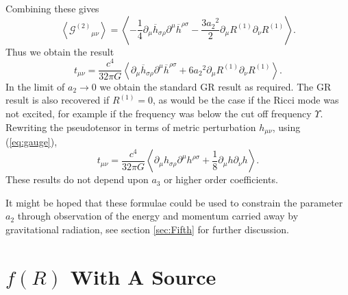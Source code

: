 \documentclass[aps,prd,reprint,showpacs]{revtex4-1}
\newcommand{\eqnref}[1]{(\ref{eq:#1})}
\newcommand{\secref}[1]{section \ref{sec:#1}}
\newcommand{\recip}[1]{\ensuremath{\frac{1}{#1}}}
\begin{document}
Combining these gives
\begin{equation}
\left\langle {\mathcal{G}^{(2)}}_{\mu\nu}\right\rangle = \left\langle -\recip{4} \partial_\mu\overline{h}_{\sigma\rho}\partial^\mu\overline{h}^{\rho\sigma} - \frac{3{a_2}^2}{2}\partial_\mu R^{(1)}\partial_\nu R^{(1)} \right\rangle.
\end{equation}
Thus we obtain the result
\begin{equation}
t_{\mu\nu} = \frac{c^4}{32\pi G}\left\langle \partial_\mu\overline{h}_{\sigma\rho}\partial^\mu\overline{h}^{\rho\sigma} + 6{a_2}^2\partial_\mu R^{(1)}\partial_\nu R^{(1)} \right\rangle.
\end{equation}
In the limit of $a_2 \rightarrow 0$ we obtain the standard GR result as required. The GR result is also recovered if $R^{(1)} = 0$, as would be the case if the Ricci mode was not excited, for example if the frequency was below the cut off frequency $\Upsilon$. Rewriting the pseudotensor in terms of metric perturbation $h_{\mu\nu}$, using \eqnref{gauge},
\begin{equation}
t_{\mu\nu} = \frac{c^4}{32\pi G}\left\langle \partial_\mu h_{\sigma\rho}\partial^\mu h^{\rho\sigma} + \recip{8}\partial_\mu h \partial_\nu h \right\rangle.
\end{equation}
These results do not depend upon $a_3$ or higher order coefficients.

It might be hoped that these formulae could be used to constrain the parameter $a_2$ through observation of the energy and momentum carried away by gravitational radiation, see \secref{Fifth} for further discussion.

\section{$f(R)$ With A Source}
\end{document}
